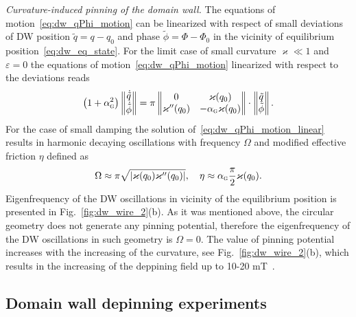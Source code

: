 {\it Curvature-induced pinning of the domain wall.} The equations of motion~\eqref{eq:dw_qPhi_motion} can be linearized with respect of small deviations of DW position $\tilde{q}=q-q_0$ and phase $\tilde{\phi}=\varPhi-\varPhi_0$ in the vicinity of equilibrium position~\eqref{eq:dw_eq_state}. For the limit case of small curvature $\varkappa\ll1$ and $\varepsilon=0$ the equations of motion~\eqref{eq:dw_qPhi_motion} linearized with respect to the deviations reads~\cite{Yershov15b}
\begin{equation}\label{eq:dw_qPhi_motion_linear}
\left(1+\alpha_\textsc{g}^2\right)\left\|\begin{matrix}
\dot{\tilde{q}}\\
\dot{\tilde{\phi}}
\end{matrix}\right\|=\pi\left\|\begin{matrix}
0 & \varkappa(q_0)\\
\varkappa''(q_0)&-\alpha_\textsc{g}\varkappa(q_0)
\end{matrix}\right\|\cdot\left\|\begin{matrix}
\tilde{q}\\
\tilde{\phi}
\end{matrix}\right\|.
\end{equation}
For the case of small damping the solution of~\eqref{eq:dw_qPhi_motion_linear} results in harmonic decaying oscillations with frequency $\Omega$ and modified effective friction $\eta$ defined as
\begin{equation}
\Omega \approx \pi\sqrt{|\varkappa(q_0)\varkappa''(q_0)|},\quad \eta\approx \alpha_\textsc{g}\frac{\pi}{2}\varkappa(q_0).
\end{equation}
Eigenfrequency of the DW oscillations in vicinity of the equilibrium position is presented in Fig.~\ref{fig:dw_wire_2}(b). As it was mentioned above, the circular geometry does not generate any pinning potential, therefore the eigenfrequency of the DW oscillations in such geometry is $\Omega=0$. The value of pinning potential increases with the increasing of the curvature, see Fig.~\ref{fig:dw_wire_2}(b), which results in the increasing of the deppining field up to 10-20 mT~\cite{Volkov19c,Lewis09}.

\subsection{Domain wall depinning experiments} \label{subsubsec:Parabola_experiments}

